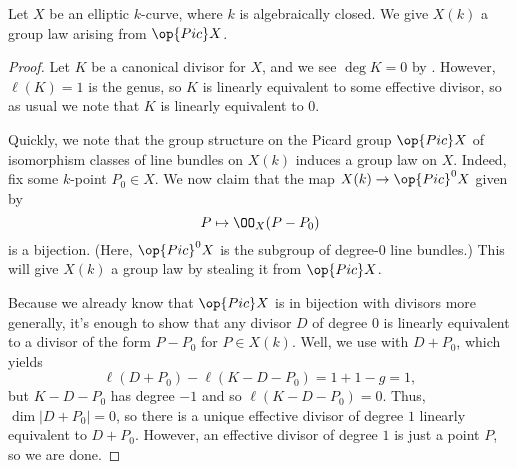 \documentclass[../notes.tex]{subfiles}
\begin{document}
\begin{corollary}
	Let $X$ be an elliptic $k$-curve, where $k$ is algebraically closed. We give $X(k)$ a group law arising from $\op{Pic}X$.
\end{corollary}
\begin{proof}
	Let $K$ be a canonical divisor for $X$, and we see $\deg K=0$ by . However, $\ell(K)=1$ is the genus, so $K$ is linearly equivalent to some effective divisor, so as usual we note that $K$ is linearly equivalent to $0$.

	Quickly, we note that the group structure on the Picard group $\op{Pic}X$ of isomorphism classes of line bundles on $X(k)$ induces a group law on $X$. Indeed, fix some $k$-point $P_0\in X$. We now claim that the map $X(k)\to\op{Pic}^0X$ given by
	\[P\mapsto\OO_X(P-P_0)\]
	is a bijection. (Here, $\op{Pic}^0X$ is the subgroup of degree-$0$ line bundles.) This will give $X(k)$ a group law by stealing it from $\op{Pic}X$.
	
	Because we already know that $\op{Pic}X$ is in bijection with divisors more generally, it's enough to show that any divisor $D$ of degree $0$ is linearly equivalent to a divisor of the form $P-P_0$ for $P\in X(k)$. Well, we use  with $D+P_0$, which yields
	\[\ell(D+P_0)-\ell(K-D-P_0)=1+1-g=1,\]
	but $K-D-P_0$ has degree $-1$ and so $\ell(K-D-P_0)=0$. Thus, $\dim|D+P_0|=0$, so there is a unique effective divisor of degree $1$ linearly equivalent to $D+P_0$. However, an effective divisor of degree $1$ is just a point $P$, so we are done.
\end{proof}
\end{document}
